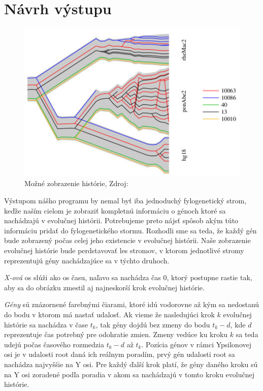 \section{Návrh výstupu}
\label{sec:vykreslene}
\begin{figure}
\centerline{\includegraphics[width=1\textwidth]{images/DUP-tube-tree}}
\caption{Možné zobrazenie histórie, Zdroj:\cite{Vinar2010}}\label{obr:tree}
\end{figure}
Výstupom nášho programu by nemal byť iba jednoduchý fylogenetický strom, keďže naším cielom je zobraziť 
kompletnú informáciu o génoch ktoré sa nachádzajú v evolučnej histórii.
Potrebujeme preto nájsť spôsob akým túto informáciu pridať do fylogenetického stormu.
Rozhodli sme sa teda, že každý gén bude zobrazený počas celej jeho existencie v evolučnej histórii. Naše zobrazenie evolučnej histórie bude perdstavovať
les stromov, v ktorom jednotlivé stromy reprezentujú gény nachádzajúce sa v týchto druhoch. 

\emph{X-ová} os slúži ako os času, naľavo sa nachádza čas 0, ktorý postupne rastie tak, aby sa do obrázku zmestil aj najneskorší krok evolučnej histórie.

\emph{Gény} sú znázornené farebnými čiarami, ktoré idú vodorovne až kým sa nedostanú do bodu v ktorom má nastať udalosť.
Ak vieme že nasledujúci krok $k$ evolučnej histórie sa nachádza v čase $t_k$, tak gény dojdú bez zmeny do bodu $t_k - d$,
kde $d$ reprezentuje čas potrebný pre odohratie zmien. Zmeny vedúce ku kroku $k$ sa teda udejú počas časového rozmedzia $t_k - d$ až $t_k$.
Pozícia génov v rámci Ypsilonovej osi je v udalosti root daná ich reálnym poradím, prvý gén udalosti root sa nachádza najvyššie na Y osi.
Pre každý ďalší krok platí, že gény daného kroku sú na Y osi zoradené podľa poradia v akom sa nachádzajú v tomto kroku evolučnej histórie.

